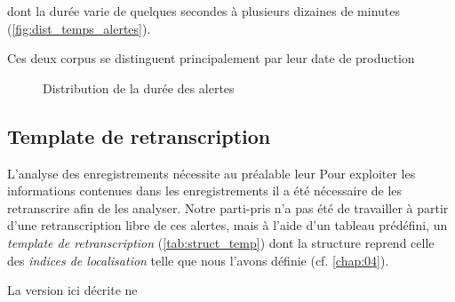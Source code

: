 dont la durée varie de quelques secondes à plusieurs dizaines de
minutes (\autoref{fig:dist_temps_alertes}).


Ces deux corpus se distinguent principalement par leur date de
production





\begin{figure}
  \centering
  
  \caption{Distribution de la durée des alertes}
  \label{fig:dist_temps_alertes}
\end{figure}

\subsection{Template de retranscription}

L'analyse des enregistrements nécessite au préalable leur 
Pour exploiter les informations contenues dans les enregistrements il
a été nécessaire de les retranscrire afin de les analyser.
%
Notre parti-pris n'a pas été de travailler à partir d'une
retranscription libre de ces alertes, mais à l'aide d'un tableau
prédéfini, un \emph{template de retranscription}
(\autoref{tab:struct_temp}) dont la structure reprend celle des
\emph{indices de localisation} telle que nous l'avons définie
(cf. \autoref{chap:04}).

La version ici décrite ne 

